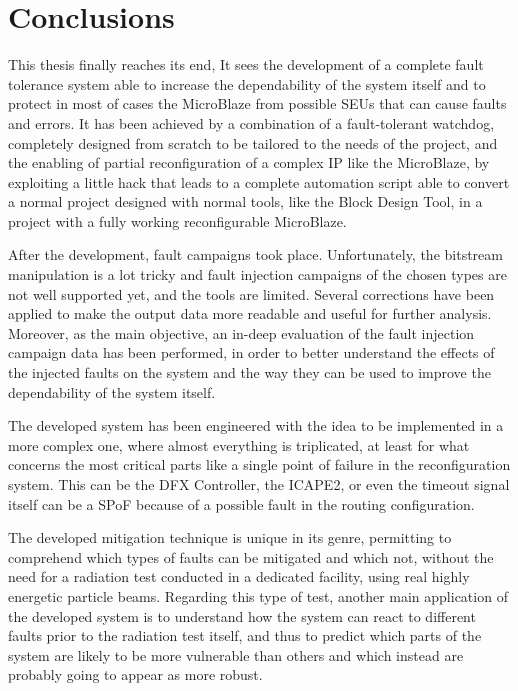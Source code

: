 \chapter{Conclusions}
\label{sec:concl}

This thesis finally reaches its end, It sees the development of a complete fault tolerance system able to increase the dependability of the system itself and to protect in most of cases the MicroBlaze from possible SEUs that can cause faults and errors. It has been achieved by a combination of a fault-tolerant watchdog, completely designed from scratch to be tailored to the needs of the project, and the enabling of partial reconfiguration of a complex IP like the MicroBlaze, by exploiting a little hack that leads to a complete automation script able to convert a normal project designed with normal tools, like the Block Design Tool, in a project with a fully working reconfigurable MicroBlaze.\bigskip

After the development, fault campaigns took place. Unfortunately, the bitstream manipulation is a lot tricky and fault injection campaigns of the chosen types are not well supported yet, and the tools are limited. Several corrections have been applied to make the output data more readable and useful for further analysis. Moreover, as the main objective, an in-deep evaluation of the fault injection campaign data has been performed, in order to better understand the effects of the injected faults on the system and the way they can be used to improve the dependability of the system itself.\bigskip

The developed system has been engineered with the idea to be implemented in a more complex one, where almost everything is triplicated, at least for what concerns the most critical parts like a single point of failure in the reconfiguration system. This can be the DFX Controller, the ICAPE2, or even the timeout signal itself can be a SPoF because of a possible fault in the routing configuration. \bigskip

The developed mitigation technique is unique in its genre, permitting to comprehend which types of faults can be mitigated and which not, without the need for a radiation test conducted in a dedicated facility, using real highly energetic particle beams. Regarding this type of test, another main application of the developed system is to understand how the system can react to different faults prior to the radiation test itself, and thus to predict which parts of the system are likely to be more vulnerable than others and which instead are probably going to appear as more robust.  

